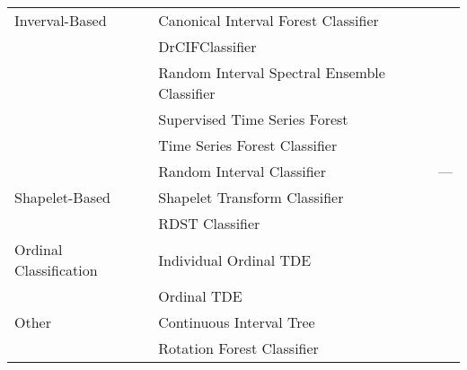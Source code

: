 \begin{table}
{\begin{tabular}{llc}
 		Inverval-Based		& Canonical Interval Forest Classifier	& \cite{CanonicalIntervalForestClassifier}\\
 					& DrCIFClassifier			& \cite{HIVECOTEV2}		\\
 			& Random Interval Spectral Ensemble Classifier & \cite{RandomIntervalSpectralEnsembleClassifier}\\
 					& Supervised Time Series Forest		& \cite{SupervisedTimeSeriesForest}\\
 					& Time Series Forest Classifier		& \cite{TimeSeriesForestClassifier}\\
 					& Random Interval Classifier		& ---				\\
 		Shapelet-Based		& Shapelet Transform Classifier		& \cite{ShapeletTransformClassifier-1}\cite{ShapeletTransformClassifier-2}\\
 					& RDST Classifier			& \cite{RDSTClassifier-1}\cite{RDSTClassifier-2}\\
 		Ordinal Classification	& Individual Ordinal TDE		& \cite{OrdinalTDE}		\\
 					& Ordinal TDE				& \cite{OrdinalTDE}		\\
 		Other			& Continuous Interval Tree		& \cite{ContinuousIntervalTree}	\\
 					& Rotation Forest Classifier		& \cite{RotationForestClassifier}\\
		\bottomrule
	\end{tabular}
	}
	\label{tab:non_cv_list}
\end{table}
